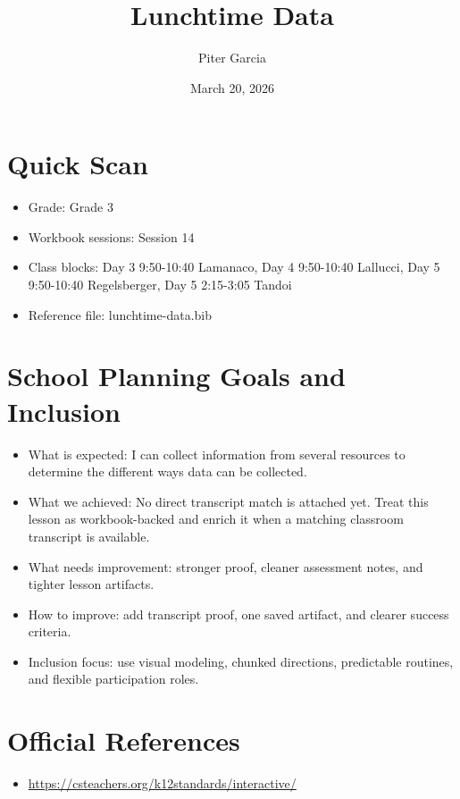 \documentclass[11pt]{article}
\title{Lunchtime Data}
\author{Piter Garcia}
\date{March 20, 2026}
\begin{document}
\maketitle
\section*{Quick Scan}
\begin{itemize}[leftmargin=*]
\item Grade: Grade 3
\item Workbook sessions: Session 14
\item Class blocks: Day 3 9:50-10:40 Lamanaco, Day 4 9:50-10:40 Lallucci, Day 5 9:50-10:40 Regelsberger, Day 5 2:15-3:05 Tandoi
\item Reference file: lunchtime-data.bib
\end{itemize}
\section*{School Planning Goals and Inclusion}
\begin{itemize}[leftmargin=*]
\item What is expected: I can collect information from several resources to determine the different ways data can be collected.
\item What we achieved: No direct transcript match is attached yet. Treat this lesson as workbook-backed and enrich it when a matching classroom transcript is available.
\item What needs improvement: stronger proof, cleaner assessment notes, and tighter lesson artifacts.
\item How to improve: add transcript proof, one saved artifact, and clearer success criteria.
\item Inclusion focus: use visual modeling, chunked directions, predictable routines, and flexible participation roles.
\end{itemize}
\section*{Official References}
\begin{itemize}[leftmargin=*]
\item \url{https://csteachers.org/k12standards/interactive/}

\end{itemize}
\end{document}
